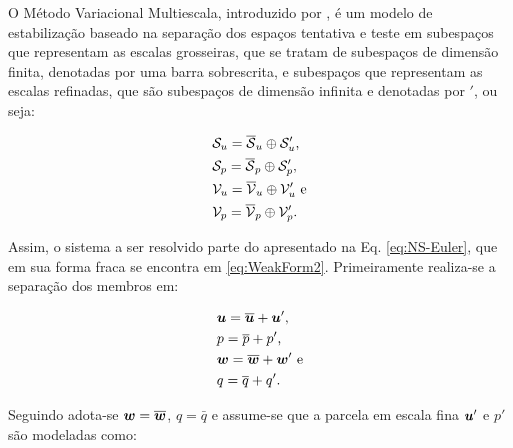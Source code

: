 
O Método Variacional Multiescala, introduzido por , é um modelo de estabilização baseado na separação dos espaços tentativa e teste em subespaços que representam as escalas grosseiras, que se tratam de subespaços de dimensão finita, denotadas por uma barra sobrescrita, e subespaços que representam as escalas refinadas, que são subespaços de dimensão infinita e denotadas por $'$, ou seja:

\begin{subequations}
    \begin{align}
         & \mathcal{S}_u=\overline{\mathcal{S}}_u\oplus\mathcal{S}'_u\text{,}  \\
         & \mathcal{S}_p=\overline{\mathcal{S}}_p\oplus\mathcal{S}'_p\text{,}  \\
         & \mathcal{V}_u=\overline{\mathcal{V}}_u\oplus\mathcal{V}'_u\text{ e} \\
         & \mathcal{V}_p=\overline{\mathcal{V}}_p\oplus\mathcal{V}'_p\text{.}
    \end{align}
\end{subequations}

Assim, o sistema a ser resolvido parte do apresentado na Eq. \eqref{eq:NS-Euler}, que em sua forma fraca se encontra em \eqref{eq:WeakForm2}. Primeiramente realiza-se a separação dos membros em:

\begin{subequations}
    \begin{align}
         & \boldsymbol{u}=\overline{\boldsymbol{u}}+\boldsymbol{u}'\text{,}  \\
         & p=\overline{p}+p'\text{,}            \\
         & \boldsymbol{w}=\overline{\boldsymbol{w}}+\boldsymbol{w}'\text{ e} \\
         & q=\overline{q}+q'\text{.}
    \end{align}
\end{subequations}

Seguindo  adota-se $\boldsymbol{w}=\overline{\boldsymbol{w}}$, $q=\bar{q}$ e assume-se que a parcela em escala fina $\boldsymbol{u}'$ e $p'$ são modeladas como:

